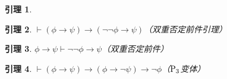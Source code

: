 \documentclass[punct=custom/kaiming,fontset=none]{ctexart}
\makeatletter
\renewenvironment{proof}[1][\proofname]{\par
  \pushQED{\qed}%
  \normalfont \topsep6\p@\@plus6\p@\relax
  \trivlist
  \item[\hskip\labelsep
    \bfseries
    #1%
    ]\ignorespaces
}{%
  \popQED\endtrivlist\@endpefalse
}
\newtheorem*{lemma*}{引理}
\let\proves\vdash
\makeatother
\begin{document}
\begin{description}
\begin{lemma*}
\begin{proof}
      \begin{ND}
        \label{1}
        \label{2}
        \label{3}
      \end{ND}
    \end{proof}
  \end{lemma*}
  \begin{lemma*}
    \label{lem:dnIntroAnte}
    \(\proves (\phi \to \psi) \to (\neg\neg\phi \to \psi)\)\hfill（双重否定前件引理）
    \begin{proof}
      \leavevmode
      \begin{ND}
        \label{1}
        \label{2}
        \label{3}
        \label{4}
        \label{5}
      \end{ND}
    \end{proof}
  \end{lemma*}
  \begin{lemma*}
    \label{ded:dnIntroAnte}
    \(\phi \to \psi \proves \neg\neg\phi \to \psi\)\hfill（双重否定前件）
    \begin{proof}
      \leavevmode
      \begin{ND}
        \label{1}
        \label{2}
      \end{ND}
    \end{proof}
  \end{lemma*}
  \begin{lemma*}
    \label{lem:p3var}
    \(\proves (\phi \to \psi) \to (\phi \to \neg\psi) \to \neg\phi\)\hfill（\(\rm P_3\)变体）

\end{lemma*}
\end{description}
\end{document}
